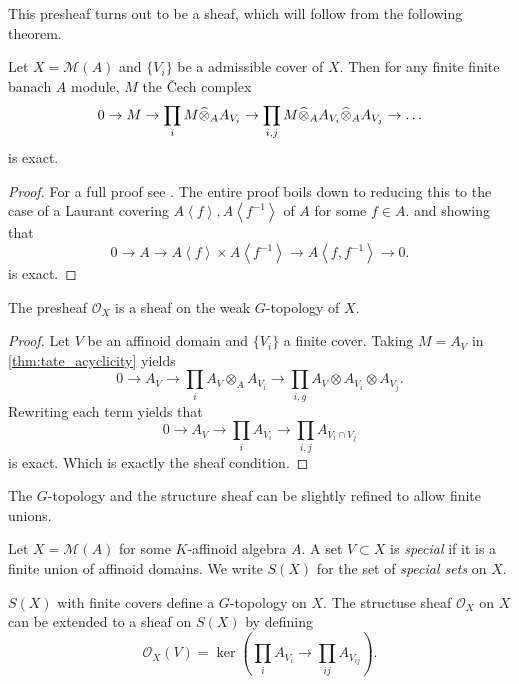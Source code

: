 This presheaf turns out to be a sheaf, which will follow from the following theorem. 
\begin{theorem}\label{thm:tate_acyclicity}
	Let $X = \mathcal{M} (A)$ and $\{V_i\} $ be a admissible cover of $X$. 
	Then for any finite finite banach $A$ module, $M$ the Čech complex \[
		0 \to M \to \prod_{i} M \widehat{\otimes}_A A_{V_i} \to \prod_{i, j} M \widehat{\otimes}_A A_{V_i} \widehat{\otimes}_A A_{V_j} \to \ldots
	\] 
	is exact. 
\end{theorem}
\begin{proof}
	For a full proof see \cite[][prop.\ 2.2.5]{berkovichSpectralTheoryAnalytic2012}. 
	The entire proof boils down to reducing this to the case of a Laurant covering $A\left<f \right>, A\left<f^{-1} \right>$ of $A$ for some $f \in A$. and showing that \[
		0 \to A \to A\left<f \right>\times  A\left<f^{-1} \right> \to A\left<f, f^{-1} \right> \to 0
	.\]  
	is exact. 
\end{proof}


\begin{corollary}
	The presheaf $\mathcal{O}_X$ is a sheaf on the weak $G$-topology of $X$.
\end{corollary}
\begin{proof}
	Let $V$ be an affinoid domain and $\{V_i\} $ a finite cover. 
	Taking $M = A_V$ in \cref{thm:tate_acyclicity} yields \[
	0 \to A_V \to \prod_{i } A_V \otimes_A A_{V_i} \to \prod_{i,g} A_V \otimes A_{V_i} \otimes A_{V_j}
	.\] 
	Rewriting each term yields that \[
	0 \to A_V \to \prod_i A_{V_i} \to \prod_{i, j} A_{V_i \cap V_j}
	\] 
	is exact. Which is exactly the sheaf condition. 
\end{proof}

The $G$-topology and the structure sheaf can be slightly refined to allow finite unions. 
\begin{definition}
	Let $X = \mathcal{M} (A)$ for some $K$-affinoid algebra $A$. 
	A set $V\subset  X$ is \emph{special} if it is a finite union of affinoid domains. 
	We write $S(X)$ for the set of \emph{special sets} on $X$. 
\end{definition}

\begin{proposition}
	$S(X)$ with finite covers define a $G$-topology on $X$. 
	The structuse sheaf  $\mathcal{O}_X$ on $X$ can be extended to a sheaf on $S(X)$ by defining \[
		\mathcal{O}_X(V) = \ker\left(\prod_i A_{V_i} \to \prod_{ij} A_{V_{ij}}\right)
	.\] 
\end{proposition}


